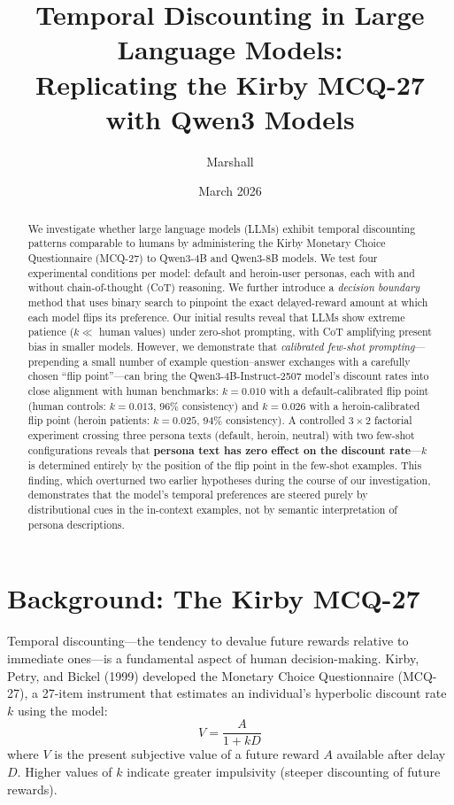 \documentclass[11pt,a4paper]{article}
\title{Temporal Discounting in Large Language Models:\\Replicating the Kirby MCQ-27 with Qwen3 Models}
\author{Marshall}
\date{March 2026}
\begin{document}
\maketitle

\begin{abstract}
We investigate whether large language models (LLMs) exhibit temporal discounting patterns comparable to humans by administering the Kirby Monetary Choice Questionnaire (MCQ-27) to Qwen3-4B and Qwen3-8B models. We test four experimental conditions per model: default and heroin-user personas, each with and without chain-of-thought (CoT) reasoning. We further introduce a \emph{decision boundary} method that uses binary search to pinpoint the exact delayed-reward amount at which each model flips its preference. Our initial results reveal that LLMs show extreme patience ($k \ll$ human values) under zero-shot prompting, with CoT amplifying present bias in smaller models. However, we demonstrate that \emph{calibrated few-shot prompting}---prepending a small number of example question--answer exchanges with a carefully chosen ``flip point''---can bring the Qwen3-4B-Instruct-2507 model's discount rates into close alignment with human benchmarks: $k = 0.010$ with a default-calibrated flip point (human controls: $k = 0.013$, 96\% consistency) and $k = 0.026$ with a heroin-calibrated flip point (heroin patients: $k = 0.025$, 94\% consistency). A controlled $3 \times 2$ factorial experiment crossing three persona texts (default, heroin, neutral) with two few-shot configurations reveals that \textbf{persona text has zero effect on the discount rate}---$k$ is determined entirely by the position of the flip point in the few-shot examples. This finding, which overturned two earlier hypotheses during the course of our investigation, demonstrates that the model's temporal preferences are steered purely by distributional cues in the in-context examples, not by semantic interpretation of persona descriptions.
\end{abstract}

\section{Background: The Kirby MCQ-27}

Temporal discounting---the tendency to devalue future rewards relative to immediate ones---is a fundamental aspect of human decision-making. Kirby, Petry, and Bickel (1999) developed the Monetary Choice Questionnaire (MCQ-27), a 27-item instrument that estimates an individual's hyperbolic discount rate $k$ using the model:
\begin{equation}
V = \frac{A}{1 + kD}
\end{equation}
where $V$ is the present subjective value of a future reward $A$ available after delay $D$. Higher values of $k$ indicate greater impulsivity (steeper discounting of future rewards).
\end{document}
